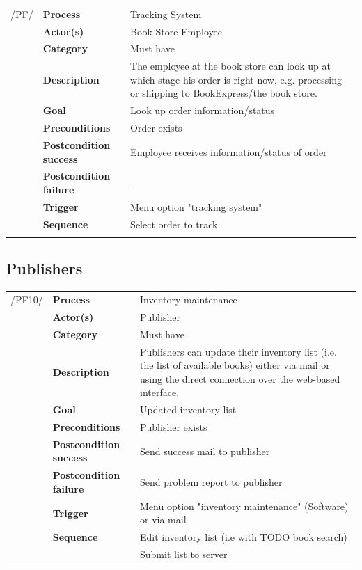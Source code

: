 \documentclass[11pt,a4paper,oneside,svgnames]{report}
\begin{document}
\noindent
\begin{tabular}{p{1.5cm}p{3cm}p{8cm}}
/PF/	& \textbf{Process} & Tracking System\\
		& \textbf{Actor(s)} & Book Store Employee\\
		& \textbf{Category} & Must have\\
		& \textbf{Description}	 & The employee at the book store can look up at which stage his order is right now, e.g. processing or shipping to BookExpress/the book store.\\
		& \textbf{Goal} & Look up order information/status\\
		& \textbf{Preconditions} & Order exists\\
		& \textbf{Postcondition success} & Employee receives information/status of order\\
		& \textbf{Postcondition failure} & -\\
		& \textbf{Trigger} & Menu option "tracking system"\\
		& \textbf{Sequence} & Select order to track\\
		
\hfill \\
\end{tabular}

\subsection{Publishers}

\noindent
\begin{tabular}{p{1.5cm}p{3cm}p{8cm}}
/PF10/	& \textbf{Process} & Inventory maintenance\\
		& \textbf{Actor(s)} & Publisher\\
		& \textbf{Category} & Must have\\
		& \textbf{Description}	 & Publishers can update their inventory list
(i.e. the list of available books) either via mail or using the direct connection over the web-based interface.\\
		& \textbf{Goal} & Updated inventory list\\
		& \textbf{Preconditions} & Publisher exists\\
		& \textbf{Postcondition success} & Send success mail to publisher\\
		& \textbf{Postcondition failure} & Send problem report to publisher\\
		& \textbf{Trigger} & Menu option "inventory maintenance" (Software) or via mail\\
		& \textbf{Sequence} & Edit inventory list (i.e with TODO book search)\\
		& & Submit list to server
		
\hfill \\
\end{tabular}
\end{document}
